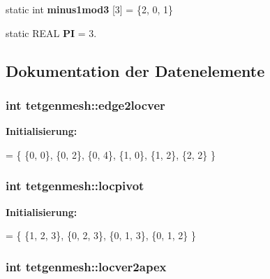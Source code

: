 \begin{DoxyCompactItemize}
\item 
\hypertarget{classtetgenmesh_a1cb441a524c4fac614d31740c48637a4}{static int {\bfseries minus1mod3} \mbox{[}3\mbox{]} = \{2, 0, 1\}}\label{classtetgenmesh_a1cb441a524c4fac614d31740c48637a4}

\item 
\hypertarget{classtetgenmesh_ad6766e0d2dbbf0a642793fbd6ef98ae2}{static R\-E\-A\-L {\bfseries P\-I} = 3.}\label{classtetgenmesh_ad6766e0d2dbbf0a642793fbd6ef98ae2}

\end{DoxyCompactItemize}


\subsection{Dokumentation der Datenelemente}
\hypertarget{classtetgenmesh_a5d635c8c2064170ca231e2f6fc0a4769}{
\subsubsection[{edge2locver}]{\setlength{\rightskip}{0pt plus 5cm}int tetgenmesh\-::edge2locver\hspace{0.3cm}{\ttfamily [static]}}}\label{classtetgenmesh_a5d635c8c2064170ca231e2f6fc0a4769}
{\bfseries Initialisierung\-:}
\begin{DoxyCode}
= \{
  \{0, 0\}, 
  \{0, 2\}, 
  \{0, 4\}, 
  \{1, 0\}, 
  \{1, 2\}, 
  \{2, 2\}  
\}
\end{DoxyCode}
\hypertarget{classtetgenmesh_ad645adfa7d72fb5a78e40856eae11a81}{
\subsubsection[{locpivot}]{\setlength{\rightskip}{0pt plus 5cm}int tetgenmesh\-::locpivot\hspace{0.3cm}{\ttfamily [static]}}}\label{classtetgenmesh_ad645adfa7d72fb5a78e40856eae11a81}
{\bfseries Initialisierung\-:}
\begin{DoxyCode}
= \{
  \{1, 2, 3\},
  \{0, 2, 3\},
  \{0, 1, 3\},
  \{0, 1, 2\}
\}
\end{DoxyCode}
\hypertarget{classtetgenmesh_a3ea450afa31311d7e1563db4168eae31}{
\subsubsection[{locver2apex}]{\setlength{\rightskip}{0pt plus 5cm}int tetgenmesh\-::locver2apex\hspace{0.3cm}{\ttfamily [static]}}}\label{classtetgenmesh_a3ea450afa31311d7e1563db4168eae31}
